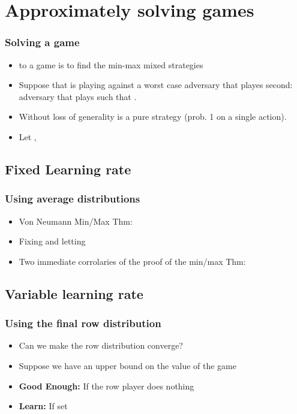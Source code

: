 \documentclass[handout]{beamer}
\begin{document}

\section{Approximately solving games}

\begin{frame}
  \frametitle{Solving a game}
  \begin{itemize}
    \item to  a game is to find the min-max mixed strategies
      \R{$\P,\Q$}
    \item Suppose that \ouralg is playing  against a
      worst case adversary that playes second: 
      adversary that plays  such that \R{$\Qt =
        \arg \maxq \mptq$}.
    \item Without loss of generality \R{$\Qt$} is a pure strategy
      (prob. 1 on a single action).
     \item Let , 
  \end{itemize}
\end{frame}

\subsection{Fixed Learning rate}
\begin{frame}
\frametitle{Using average distributions}
\begin{itemize}
\item Von Neumann Min/Max Thm: 
\item Fixing  and letting 
\item Two immediate corrolaries of the proof of the min/max Thm:

\end{itemize}
\end{frame}

\subsection{Variable learning rate}
\begin{frame}
\frametitle{Using the final row distribution \R{\lwalgvar}}
\begin{itemize}
\item Can we make the row distribution converge?
\item Suppose we have an upper bound on the value of the game 
\item {\bf Good Enough:} If  the row player does nothing
\item {\bf Learn:} If  set
\end{itemize}
\end{frame}
\end{document}
